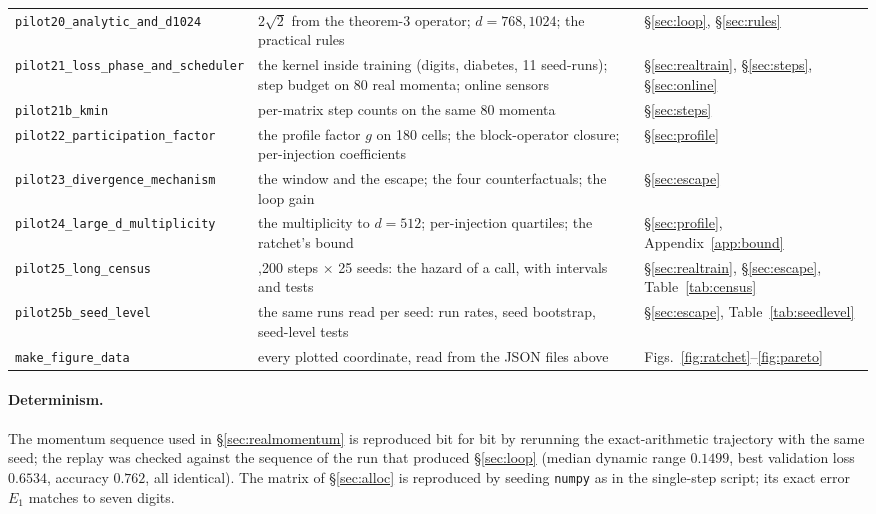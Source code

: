 \begin{table}[h]
\begin{tabular}{>{\raggedright\arraybackslash}p{5.6cm}
                >{\raggedright\arraybackslash}p{6.3cm}
                >{\raggedright\arraybackslash}p{3.4cm}}
\texttt{pilot20\_analytic\_and\_d1024} & $2\sqrt2$ from the theorem-3 operator; $d=768,1024$; the practical rules & \S\ref{sec:loop}, \S\ref{sec:rules} \\
\texttt{pilot21\_loss\_phase\_and\_scheduler} & the kernel inside training (digits, diabetes, 11 seed-runs); step budget on 80 real momenta; online sensors & \S\ref{sec:realtrain}, \S\ref{sec:steps}, \S\ref{sec:online} \\
\texttt{pilot21b\_kmin} & per-matrix step counts on the same 80 momenta & \S\ref{sec:steps} \\
\texttt{pilot22\_participation\_factor} & the profile factor $g$ on 180 cells; the block-operator closure; per-injection coefficients & \S\ref{sec:profile} \\
\texttt{pilot23\_divergence\_mechanism} & the window and the escape; the four counterfactuals; the loop gain & \S\ref{sec:escape} \\
\texttt{pilot24\_large\_d\_multiplicity} & the multiplicity to $d=512$; per-injection quartiles; the ratchet's bound & \S\ref{sec:profile}, Appendix~\ref{app:bound} \\
\texttt{pilot25\_long\_census} & 1,200 steps $\times$ 25 seeds: the hazard of a call, with intervals and tests & \S\ref{sec:realtrain}, \S\ref{sec:escape}, Table~\ref{tab:census} \\
\texttt{pilot25b\_seed\_level} & the same runs read per seed: run rates, seed bootstrap, seed-level tests & \S\ref{sec:escape}, Table~\ref{tab:seedlevel} \\
\texttt{make\_figure\_data} & every plotted coordinate, read from the JSON files above & Figs.~\ref{fig:ratchet}--\ref{fig:pareto} \\
\bottomrule
\end{tabular}
\end{table}

\paragraph{Determinism.}
The momentum sequence used in \S\ref{sec:realmomentum} is reproduced bit for bit
by rerunning the exact-arithmetic trajectory with the same seed; the replay was
checked against the sequence of the run that produced \S\ref{sec:loop} (median
dynamic range $0.1499$, best validation loss $0.6534$, accuracy $0.762$, all
identical).  The matrix of \S\ref{sec:alloc} is reproduced by seeding
\texttt{numpy} as in the single-step script; its exact error $E_1$ matches to
seven digits.

